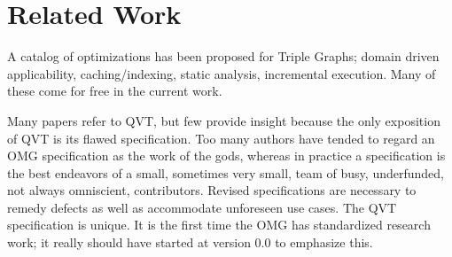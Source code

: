\documentclass{llncs}
\begin{document}







\section{Related Work}\label{Related Work}

A catalog of optimizations has been proposed \cite{TGG-Optimization} for Triple Graphs; domain driven applicability, caching/indexing, static analysis, incremental execution. Many of these come for free in the current work.

Many papers refer to QVT, but few provide insight because the only exposition of QVT is its flawed specification. Too many authors have tended to regard an OMG specification as the work of the gods, whereas in practice a specification is the best endeavors of a small, sometimes very small, team of busy, underfunded, not always omniscient, contributors. Revised specifications are necessary to remedy defects as well as accommodate unforeseen use cases. The QVT specification is unique. It is the first time the OMG has standardized research work; it really should have started at version 0.0 to emphasize this.
\end{document}
